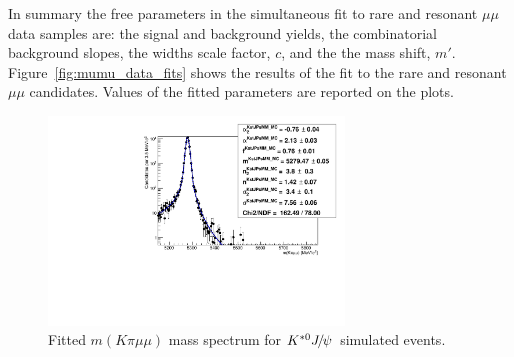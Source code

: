 In summary the free parameters in the simultaneous fit to rare and resonant $\mu\mu$ data samples are:
the signal and background yields, the combinatorial background slopes, the widths scale factor, $c$, and
the the mass shift, $m'$.
%
Figure~\ref{fig:mumu_data_fits} shows the results of the fit to the rare and resonant
$\mu\mu$ candidates. Values of the fitted parameters are reported on the plots.
%
\begin{figure}[h!]
\centering \includegraphics[width=0.7\textwidth]{RKst/figs/Fit/fit_MM/KstJPsMM_MC_log.pdf}
\caption{Fitted $m(K\pi \mu\mu)$ mass spectrum for $\Kstarz\jpsi$ simulated events. }
\label{fig:mumu_MC_fits}
\end{figure}
%
